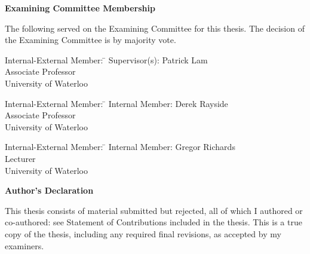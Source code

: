 \cleardoublepage %

 
\begin{center}\textbf{Examining Committee Membership}\end{center}
  \noindent
The following served on the Examining Committee for this thesis. The decision of the Examining Committee is by majority vote.
  \bigskip
  
  \noindent
\begin{tabbing}
Internal-External Member: \=  \kill %
Supervisor(s): \> Patrick Lam \\
\> Associate Professor \\
\> University of Waterloo \\
\end{tabbing}
  \bigskip
  
  \noindent
  \begin{tabbing}
Internal-External Member: \=  \kill %
Internal Member: \> Derek Rayside \\
\> Associate Professor \\
\> University of Waterloo \\
\end{tabbing}
  \bigskip
  
  \noindent
\begin{tabbing}
Internal-External Member: \=  \kill %
Internal Member: \> Gregor Richards \\
\> Lecturer \\
\> University of Waterloo \\
\end{tabbing}
  \bigskip

\cleardoublepage

 \begin{center}\textbf{Author's Declaration}\end{center}
  
 \noindent
This thesis consists of material submitted but rejected, all of which I authored or co-authored: see Statement of Contributions included in the thesis. This is a true copy of the thesis, including any required final revisions, as accepted by my examiners.


